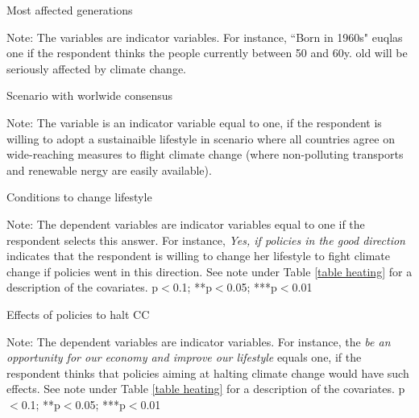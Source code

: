 \documentclass{article}
\begin{document}
\begin{table}[h!]
	\caption{Most affected generations}
	\begin{center}
		\scalebox{0.7}{}
	\end{center}
	{\footnotesize Note: The variables are indicator variables. For instance, ``Born in 1960s" euqlas one if the respondent thinks the people currently between 50 and 60y. old will be seriously affected by climate change.}
\end{table}		

\begin{table}[h!]
	\caption{Scenario with worlwide consensus}
	\begin{center}
		\scalebox{0.7}{}
	\end{center}
	{\footnotesize Note: The variable is an indicator variable equal to one, if the respondent is willing to adopt a sustainaible lifestyle in scenario where all countries agree on wide-reaching measures to flight climate change (where non-polluting transports and renewable nergy are easily available).}
\end{table}		

\begin{landscape}
	\begin{table}[h!]
		\caption{Conditions to change lifestyle}
		\begin{center}
			\scalebox{0.5}{}
		\end{center}
	{\footnotesize Note: The dependent variables are indicator variables equal to one if the respondent selects this answer. For instance, \textit{Yes, if policies in the good direction} indicates that the respondent is willing to change her lifestyle to fight climate change if policies went in this direction. See note under Table \ref{table heating} for a description of the covariates.
	\newline *p$<$0.1; **p$<$0.05; ***p$<$0.01}
	\end{table}		
\end{landscape}

\begin{landscape}
	\begin{table}[h!]
		\caption{Effects of policies to halt CC}
		\begin{center}
			\scalebox{0.6}{}
		\end{center}
	{\footnotesize Note: The dependent variables are indicator variables. For instance, the \textit{be an opportunity for our economy and improve our lifestyle} equals one, if the respondent thinks that policies aiming at halting climate change would have such effects. See note under Table \ref{table heating} for a description of the covariates.
	\newline *p$<$0.1; **p$<$0.05; ***p$<$0.01}
	\end{table}		
\end{landscape}
\end{document}
